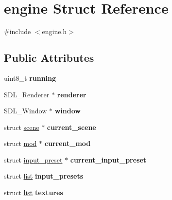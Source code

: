 \hypertarget{structengine}{\section{engine Struct Reference}
\label{structengine}
}


{\ttfamily \#include $<$engine.\-h$>$}

\subsection*{Public Attributes}
\begin{DoxyCompactItemize}
\item 
\hypertarget{structengine_a4246de2d86c2fd92d6b1c3db899a3852}{uint8\-\_\-t {\bfseries running}}\label{structengine_a4246de2d86c2fd92d6b1c3db899a3852}

\item 
\hypertarget{structengine_a57f5bc341fb4b77797d5fd93e96d12a5}{S\-D\-L\-\_\-\-Renderer $\ast$ {\bfseries renderer}}\label{structengine_a57f5bc341fb4b77797d5fd93e96d12a5}

\item 
\hypertarget{structengine_a9b38c75a157891761f7a2c3625b25deb}{S\-D\-L\-\_\-\-Window $\ast$ {\bfseries window}}\label{structengine_a9b38c75a157891761f7a2c3625b25deb}

\item 
\hypertarget{structengine_a7ccab68a62ea302b6babb10e87699415}{struct \hyperlink{structscene}{scene} $\ast$ {\bfseries current\-\_\-scene}}\label{structengine_a7ccab68a62ea302b6babb10e87699415}

\item 
\hypertarget{structengine_ad87b521cff64573cc295ff6d7d81aad5}{struct \hyperlink{structmod}{mod} $\ast$ {\bfseries current\-\_\-mod}}\label{structengine_ad87b521cff64573cc295ff6d7d81aad5}

\item 
\hypertarget{structengine_ad2d67424042196bcca2b6269eea228c3}{struct \hyperlink{structinput__preset}{input\-\_\-preset} $\ast$ {\bfseries current\-\_\-input\-\_\-preset}}\label{structengine_ad2d67424042196bcca2b6269eea228c3}

\item 
\hypertarget{structengine_ad35c9b4167117b550fe9574316ccdaa2}{struct \hyperlink{structlist}{list} {\bfseries input\-\_\-presets}}\label{structengine_ad35c9b4167117b550fe9574316ccdaa2}

\item 
\hypertarget{structengine_a2b43e78254aea1136224bfa678fdf8ef}{struct \hyperlink{structlist}{list} {\bfseries textures}}\label{structengine_a2b43e78254aea1136224bfa678fdf8ef}

\end{DoxyCompactItemize}


